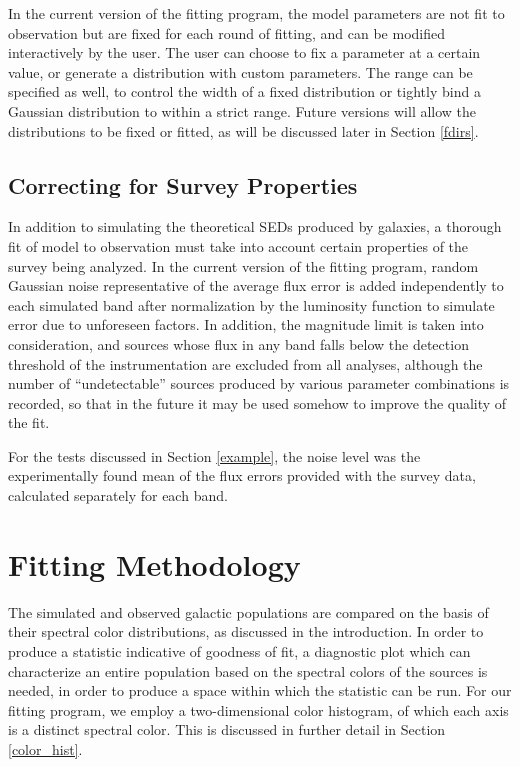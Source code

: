 \documentclass[twocolumn,letterpaper,10pt]{article}
\begin{document}
In the current version of the fitting program, the model parameters are not fit to observation but are fixed for each round of fitting, and can be modified interactively by the user. The user can choose to fix a parameter at a certain value, or generate a distribution with custom parameters. The range can be specified as well, to control the width of a fixed distribution or tightly bind a Gaussian distribution to within a strict range. Future versions will allow the distributions to be fixed or fitted, as will be discussed later in Section \ref{fdirs}.

\subsection{Correcting for Survey Properties}

In addition to simulating the theoretical SEDs produced by galaxies, a thorough fit of model to observation must take into account certain properties of the survey being analyzed. In the current version of the fitting program, random Gaussian noise representative of the average flux error is added independently to each simulated band after normalization by the luminosity function to simulate error due to unforeseen factors. In addition, the magnitude limit is taken into consideration, and sources whose flux in any band falls below the detection threshold of the instrumentation are excluded from all analyses, although the number of ``undetectable'' sources produced by various parameter combinations is recorded, so that in the future it may be used somehow to improve the quality of the fit. 

For the tests discussed in Section \ref{example}, the noise level was the experimentally found mean of the flux errors provided with the survey data, calculated separately for each band.

\section{Fitting Methodology}

The simulated and observed galactic populations are compared on the basis of their spectral color distributions, as discussed in the introduction. In order to produce a statistic indicative of goodness of fit, a diagnostic plot which can characterize an entire population based on the spectral colors of the sources is needed, in order to produce a space within which the statistic can be run. For our fitting program, we employ a two-dimensional color histogram, of which each axis is a distinct spectral color. This is discussed in further detail in Section \ref{color_hist}. 
\end{document}
